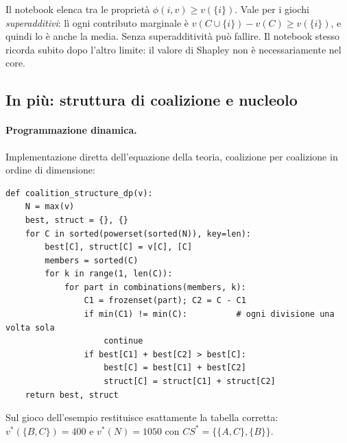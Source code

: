 \begin{attenzione}
Il notebook elenca tra le proprietà $\phi(i,v) \ge v(\{i\})$. Vale per i giochi
\emph{superadditivi}: lì ogni contributo marginale è
$v(C \cup \{i\}) - v(C) \ge v(\{i\})$, e quindi lo è anche la media. Senza superadditività
può fallire. Il notebook stesso ricorda subito dopo l'altro limite: il valore di Shapley
non è necessariamente nel core.
\end{attenzione}

\subsection{In più: struttura di coalizione e nucleolo}

\paragraph{Programmazione dinamica.}
Implementazione diretta dell'equazione della teoria, coalizione per coalizione in ordine di
dimensione:
\begin{lstlisting}
def coalition_structure_dp(v):
    N = max(v)
    best, struct = {}, {}
    for C in sorted(powerset(sorted(N)), key=len):
        best[C], struct[C] = v[C], [C]
        members = sorted(C)
        for k in range(1, len(C)):
            for part in combinations(members, k):
                C1 = frozenset(part); C2 = C - C1
                if min(C1) != min(C):          # ogni divisione una volta sola
                    continue
                if best[C1] + best[C2] > best[C]:
                    best[C] = best[C1] + best[C2]
                    struct[C] = struct[C1] + struct[C2]
    return best, struct
\end{lstlisting}
Sul gioco dell'esempio restituisce esattamente la tabella corretta: $v^*(\{B,C\}) = 400$ e
$v^*(N) = 1050$ con $CS^* = \{\{A,C\},\{B\}\}$.

